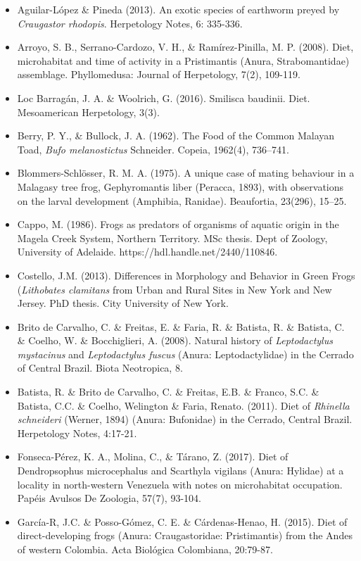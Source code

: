 \documentclass[11pt]{article}
\begin{document}
\begin{itemize}
\item Aguilar-López \& Pineda (2013). An exotic species of earthworm preyed by \textit{Craugastor rhodopis}. Herpetology Notes, 6: 335-336.
\item Arroyo, S. B., Serrano-Cardozo, V. H., \& Ramírez-Pinilla, M. P. (2008). Diet, microhabitat and time of activity in a Pristimantis (Anura, Strabomantidae) assemblage. Phyllomedusa: Journal of Herpetology, 7(2), 109-119.         
\item Loc Barragán, J. A. \& Woolrich, G. (2016). Smilisca baudinii. Diet. Mesoamerican Herpetology, 3(3).
\item Berry, P. Y., \& Bullock, J. A. (1962). The Food of the Common Malayan Toad, \textit{Bufo melanostictus} Schneider. Copeia, 1962(4), 736–741. 
\item Blommers-Schlösser, R. M. A. (1975). A unique case of mating behaviour in a Malagasy tree frog, Gephyromantis liber (Peracca, 1893), with observations on the larval development (Amphibia, Ranidae). Beaufortia, 23(296), 15–25.
\item Cappo, M. (1986). Frogs as predators of organisms of aquatic origin in the Magela Creek System, Northern Territory. MSc thesis. Dept of Zoology, University of Adelaide. https://hdl.handle.net/2440/110846.
\item Costello, J.M. (2013). Differences in Morphology and Behavior in Green Frogs (\textit{Lithobates clamitans} from Urban and Rural Sites in New York and New Jersey. PhD thesis. City University of New York. 
\item Brito de Carvalho, C. \& Freitas, E. \& Faria, R. \& Batista, R. \& Batista, C. \& Coelho, W. \& Bocchiglieri, A. (2008). Natural history of \textit{Leptodactylus mystacinus} and \textit{Leptodactylus fuscus} (Anura: Leptodactylidae) in the Cerrado of Central Brazil. Biota Neotropica, 8. 
\item Batista, R. \& Brito de Carvalho, C. \& Freitas, E.B. \& Franco, S.C. \& Batista, C.C. \& Coelho, Welington \& Faria, Renato. (2011). Diet of \textit{Rhinella schneideri} (Werner, 1894) (Anura: Bufonidae) in the Cerrado, Central Brazil. Herpetology Notes, 4:17-21. 
\item Fonseca-Pérez, K. A., Molina, C., \& Tárano, Z. (2017). Diet of Dendropsophus microcephalus and Scarthyla vigilans (Anura: Hylidae) at a locality in north-western Venezuela with notes on microhabitat occupation. Papéis Avulsos De Zoologia, 57(7), 93-104.
\item García-R, J.C. \& Posso-Gómez, C. E. \& Cárdenas-Henao, H. (2015). Diet of direct-developing frogs (Anura: Craugastoridae: Pristimantis) from the Andes of western Colombia. Acta Biológica Colombiana, 20:79-87. 

\end{itemize}
\end{document}
